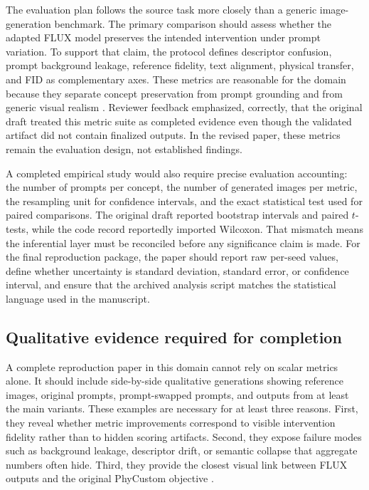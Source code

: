 \documentclass{article}
\begin{document}
The evaluation plan follows the source task more closely than a generic image-generation benchmark. The primary comparison should assess whether the adapted FLUX model preserves the intended intervention under prompt variation. To support that claim, the protocol defines descriptor confusion, prompt background leakage, reference fidelity, text alignment, physical transfer, and FID as complementary axes. These metrics are reasonable for the domain because they separate concept preservation from prompt grounding and from generic visual realism \cite{wu2025phycustom}. Reviewer feedback emphasized, correctly, that the original draft treated this metric suite as completed evidence even though the validated artifact did not contain finalized outputs. In the revised paper, these metrics remain the evaluation design, not established findings.

A completed empirical study would also require precise evaluation accounting: the number of prompts per concept, the number of generated images per metric, the resampling unit for confidence intervals, and the exact statistical test used for paired comparisons. The original draft reported bootstrap intervals and paired \(t\)-tests, while the code record reportedly imported Wilcoxon. That mismatch means the inferential layer must be reconciled before any significance claim is made. For the final reproduction package, the paper should report raw per-seed values, define whether uncertainty is standard deviation, standard error, or confidence interval, and ensure that the archived analysis script matches the statistical language used in the manuscript.

\subsection{Qualitative evidence required for completion}

A complete reproduction paper in this domain cannot rely on scalar metrics alone. It should include side-by-side qualitative generations showing reference images, original prompts, prompt-swapped prompts, and outputs from at least the main variants. These examples are necessary for at least three reasons. First, they reveal whether metric improvements correspond to visible intervention fidelity rather than to hidden scoring artifacts. Second, they expose failure modes such as background leakage, descriptor drift, or semantic collapse that aggregate numbers often hide. Third, they provide the closest visual link between FLUX outputs and the original PhyCustom objective \cite{wu2025phycustom}.
\end{document}
